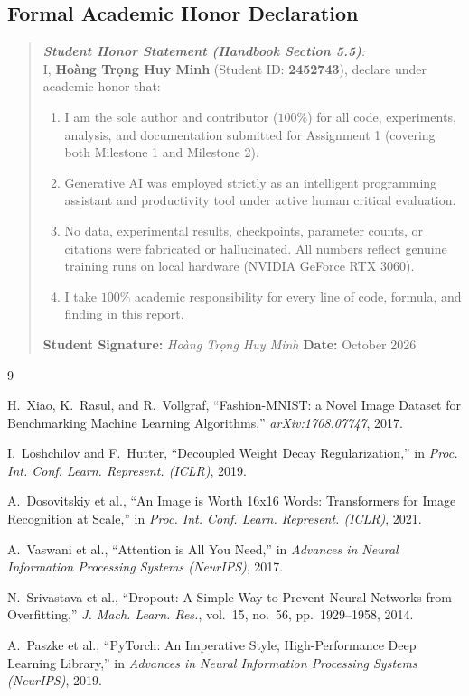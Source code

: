 \documentclass[11pt, a4paper]{article}
\begin{document}
\subsection{Formal Academic Honor Declaration}
\begin{quote}
\textit{\textbf{Student Honor Statement (Handbook Section 5.5)}:}\\
I, \textbf{Hoàng Trọng Huy Minh} (Student ID: \textbf{2452743}), declare under academic honor that:
\begin{enumerate}[noitemsep]
  \item I am the sole author and contributor ($100\%$) for all code, experiments, analysis, and documentation submitted for Assignment 1 (covering both Milestone 1 and Milestone 2).
  \item Generative AI was employed strictly as an intelligent programming assistant and productivity tool under active human critical evaluation.
  \item No data, experimental results, checkpoints, parameter counts, or citations were fabricated or hallucinated. All numbers reflect genuine training runs on local hardware (NVIDIA GeForce RTX 3060).
  \item I take $100\%$ academic responsibility for every line of code, formula, and finding in this report.
\end{enumerate}
\textbf{Student Signature:} \textit{Hoàng Trọng Huy Minh} \qquad \textbf{Date:} October 2026
\end{quote}

\begin{thebibliography}{9}

H.~Xiao, K.~Rasul, and R.~Vollgraf, ``Fashion-MNIST: a Novel Image Dataset for Benchmarking Machine Learning Algorithms,'' \textit{arXiv:1708.07747}, 2017.

I.~Loshchilov and F.~Hutter, ``Decoupled Weight Decay Regularization,'' in \textit{Proc. Int. Conf. Learn. Represent. (ICLR)}, 2019.

A.~Dosovitskiy et al., ``An Image is Worth 16x16 Words: Transformers for Image Recognition at Scale,'' in \textit{Proc. Int. Conf. Learn. Represent. (ICLR)}, 2021.

A.~Vaswani et al., ``Attention is All You Need,'' in \textit{Advances in Neural Information Processing Systems (NeurIPS)}, 2017.

N.~Srivastava et al., ``Dropout: A Simple Way to Prevent Neural Networks from Overfitting,'' \textit{J. Mach. Learn. Res.}, vol.~15, no.~56, pp.~1929--1958, 2014.

A.~Paszke et al., ``PyTorch: An Imperative Style, High-Performance Deep Learning Library,'' in \textit{Advances in Neural Information Processing Systems (NeurIPS)}, 2019.

\end{thebibliography}
\end{document}
